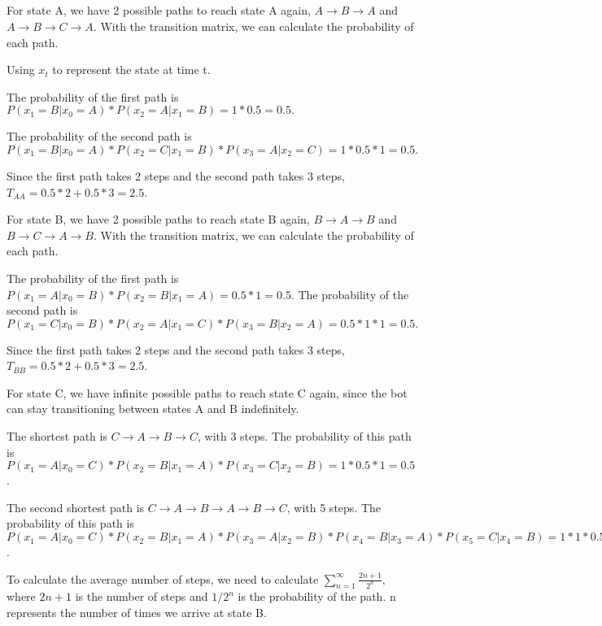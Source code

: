 \documentclass{article}
\begin{document}
\subsection{}

For state A, we have 2 possible paths to reach state A again, $A \rightarrow B \rightarrow A$ and 
$A \rightarrow B \rightarrow C \rightarrow A$. With the transition matrix, we can calculate the probability of each path.

\bigskip

Using $x_t$ to represent the state at time t. 

The probability of the first path is $P(x_1=B|x_0=A) * P(x_2=A|x_1=B) = 1 * 0.5 = 0.5.$

The probability of the second path is $P(x_1=B|x_0=A) * P(x_2=C|x_1=B) * P(x_3=A|x_2=C) = 1 * 0.5 * 1 = 0.5.$


Since the first path takes 2 steps and the second path takes 3 steps, 
$T_{AA} = 0.5 * 2 + 0.5 * 3 = 2.5$.

\bigskip

For state B, we have 2 possible paths to reach state B again, $B \rightarrow A \rightarrow B$ and
$B \rightarrow C \rightarrow A \rightarrow B$. With the transition matrix, we can calculate the probability of each path.

The probability of the first path is $P(x_1=A|x_0=B) * P(x_2=B|x_1=A) = 0.5 * 1 = 0.5.$
The probability of the second path is $P(x_1=C|x_0=B) * P(x_2=A|x_1=C) * P(x_3=B|x_2=A) = 0.5 * 1 * 1 = 0.5.$

Since the first path takes 2 steps and the second path takes 3 steps,
$T_{BB} = 0.5 * 2 + 0.5 * 3 = 2.5$.

\bigskip

For state C, we have infinite possible paths to reach state C again, since the bot can stay transitioning between states A and B indefinitely.

The shortest path is $C \rightarrow A \rightarrow B \rightarrow C$, with 3 steps.
The probability of this path is $P(x_1=A|x_0=C) * P(x_2=B|x_1=A) * P(x_3=C|x_2=B) = 1 * 0.5 * 1 = 0.5$.

The second shortest path is $C \rightarrow A \rightarrow B \rightarrow A \rightarrow B \rightarrow C$, with 5 steps.
The probability of this path is $P(x_1=A|x_0=C) * P(x_2=B|x_1=A) * P(x_3=A|x_2=B) * P(x_4=B|x_3=A) * P(x_5=C|x_4=B) 
= 1 * 1 * 0.5 * 1 * 0.5 = 0.25$.


To calculate the average number of steps, we need to calculate $\sum_{n=1}^{\infty} \frac{2n + 1}{2^n}$, 
where $2n + 1$ is the number of steps and $1/2^n$ is the probability of the path. n represents the number of times we arrive at 
state B.
\end{document}
